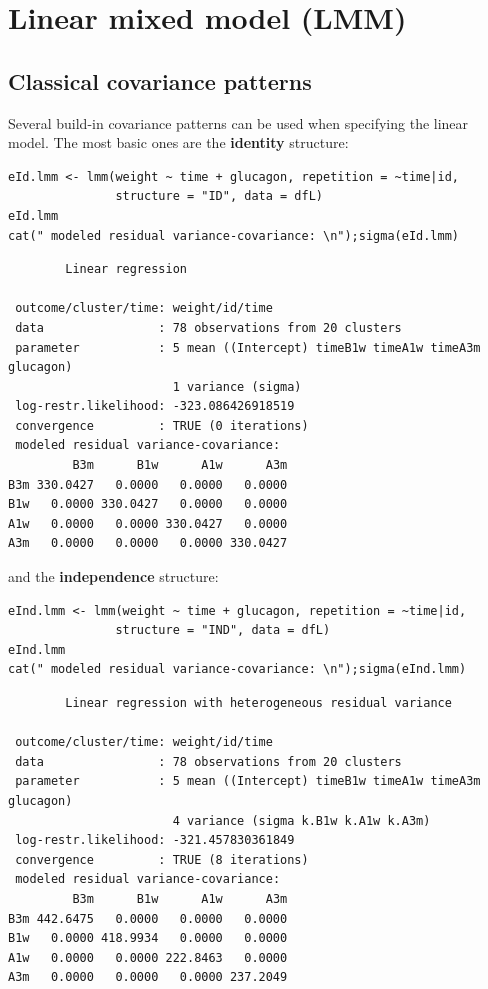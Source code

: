 \documentclass[12pt]{article}
\begin{document}
\clearpage

\section{Linear mixed model (LMM)}
\label{sec:orgb93a61a}
\subsection{Classical covariance patterns}
\label{sec:orgd832233}

Several build-in covariance patterns can be used when specifying the
linear model. The most basic ones are the \textbf{identity} structure:
\lstset{language=r,label= ,caption= ,captionpos=b,numbers=none}
\begin{lstlisting}
eId.lmm <- lmm(weight ~ time + glucagon, repetition = ~time|id, 
               structure = "ID", data = dfL)
eId.lmm
cat(" modeled residual variance-covariance: \n");sigma(eId.lmm)
\end{lstlisting}

\begin{verbatim}
		Linear regression 

 outcome/cluster/time: weight/id/time 
 data                : 78 observations from 20 clusters 
 parameter           : 5 mean ((Intercept) timeB1w timeA1w timeA3m glucagon) 
                       1 variance (sigma) 
 log-restr.likelihood: -323.086426918519 
 convergence         : TRUE (0 iterations)
 modeled residual variance-covariance: 
         B3m      B1w      A1w      A3m
B3m 330.0427   0.0000   0.0000   0.0000
B1w   0.0000 330.0427   0.0000   0.0000
A1w   0.0000   0.0000 330.0427   0.0000
A3m   0.0000   0.0000   0.0000 330.0427
\end{verbatim}

and the \textbf{independence} structure:
\lstset{language=r,label= ,caption= ,captionpos=b,numbers=none}
\begin{lstlisting}
eInd.lmm <- lmm(weight ~ time + glucagon, repetition = ~time|id, 
               structure = "IND", data = dfL)
eInd.lmm
cat(" modeled residual variance-covariance: \n");sigma(eInd.lmm)
\end{lstlisting}

\begin{verbatim}
		Linear regression with heterogeneous residual variance 

 outcome/cluster/time: weight/id/time 
 data                : 78 observations from 20 clusters 
 parameter           : 5 mean ((Intercept) timeB1w timeA1w timeA3m glucagon) 
                       4 variance (sigma k.B1w k.A1w k.A3m) 
 log-restr.likelihood: -321.457830361849 
 convergence         : TRUE (8 iterations)
 modeled residual variance-covariance: 
         B3m      B1w      A1w      A3m
B3m 442.6475   0.0000   0.0000   0.0000
B1w   0.0000 418.9934   0.0000   0.0000
A1w   0.0000   0.0000 222.8463   0.0000
A3m   0.0000   0.0000   0.0000 237.2049
\end{verbatim}
\end{document}
